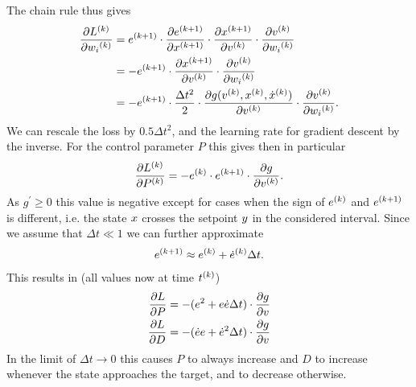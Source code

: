 \documentclass{article}
\begin{document}
    The chain rule thus gives
    \begin{align}
        \frac{\partial {L}^{(k)}}{\partial {w_i}^{(k)}} &= {e}^{(k+1)} \cdot \frac{\partial {e}^{(k+1)}}{\partial {x}^{(k+1)}} 
                                                             \cdot \frac{\partial {x}^{(k+1)}}{\partial {v}^{(k)}} 
                                                             \cdot \frac{\partial {v}^{(k)}}{\partial {w_i}^{(k)}} \nonumber \\
         &= -{e}^{(k+1)} \cdot \frac{\partial {x}^{(k+1)}}{\partial {v}^{(k)}} 
                               \cdot \frac{\partial {v}^{(k)}}{\partial {w_i}^{(k)}} \label{eq:discrete_gradient} \\
                        &= -{e}^{(k+1)} \cdot \frac{\Delta t^2}{2} 
                                              \cdot \frac{\partial g({v}^{(k)}, {x}^{(k)}, {\dot{x}}^{(k)})}{\partial {v}^{(k)}} 
                                              \cdot \frac{\partial {v}^{(k)}}{\partial {w_i}^{(k)}}.
    \end{align}
    We can rescale the loss by $0.5 \Delta t^2$, and the learning rate for gradient descent by the inverse. 
    For the control parameter $P$ this gives then in particular
    \begin{align}
        \frac{\partial {L}^{(k)}}{\partial {P}^{(k)}} = - {e}^{(k)} \cdot {e}^{(k+1)} \cdot \frac{\partial g}{\partial {v}^{(k)}}. \label{eq:diverging_p_local}
    \end{align}
    As $g^\prime \geq 0$ this value is negative except for cases when the sign of 
    ${e}^{(k)}$ and ${e}^{(k+1)}$ is different, 
    i.e. the state $x$ crosses the setpoint $y$ in the considered interval. Since we 
    assume that $\Delta t \ll 1$ we can further approximate
    \begin{align}
        {e}^{(k+1)} \approx {e}^{(k)} + {\dot{e}}^{(k)} \Delta t.
    \end{align}
    This results in (all values now at time ${t}^{(k)}$)
    \begin{align}
        \frac{\partial L}{\partial P} = -(e^2 + e \dot{e} \Delta t) \cdot \frac{\partial g}{\partial v} \\
        \frac{\partial L}{\partial D} = -(\dot{e} e + \dot{e}^2 \Delta t) \cdot \frac{\partial g}{\partial v}
    \end{align}
    In the limit of $\Delta t \rightarrow 0$ this causes $P$ to always increase and $D$ to increase 
    whenever the state approaches the target, and to decrease otherwise.
\end{document}
